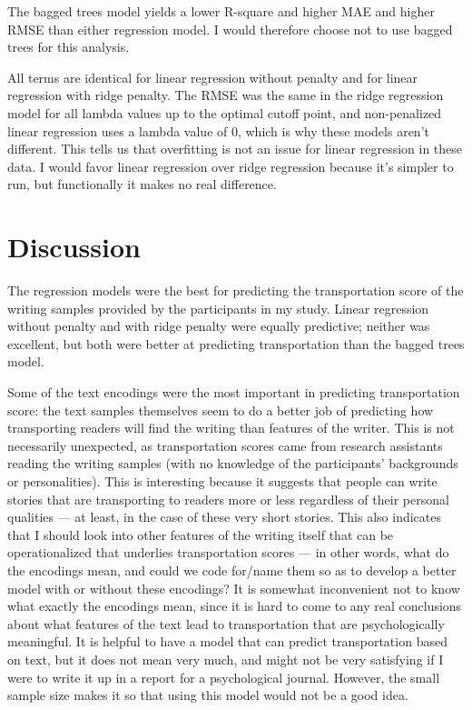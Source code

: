 \documentclass[
  man,floatsintext]{apa6}
\begin{document}
The bagged trees model yields a lower R-square and higher MAE and higher RMSE than either regression model. I would therefore choose not to use bagged trees for this analysis.

All terms are identical for linear regression without penalty and for linear regression with ridge penalty. The RMSE was the same in the ridge regression model for all lambda values up to the optimal cutoff point, and non-penalized linear regression uses a lambda value of 0, which is why these models aren't different. This tells us that overfitting is not an issue for linear regression in these data. I would favor linear regression over ridge regression because it's simpler to run, but functionally it makes no real difference.

\hypertarget{discussion}{%
\section{Discussion}\label{discussion}}

The regression models were the best for predicting the transportation score of the writing samples provided by the participants in my study. Linear regression without penalty and with ridge penalty were equally predictive; neither was excellent, but both were better at predicting transportation than the bagged trees model.

Some of the text encodings were the most important in predicting transportation score: the text samples themselves seem to do a better job of predicting how transporting readers will find the writing than features of the writer. This is not necessarily unexpected, as transportation scores came from research assistants reading the writing samples (with no knowledge of the participants' backgrounds or personalities). This is interesting because it suggests that people can write stories that are transporting to readers more or less regardless of their personal qualities --- at least, in the case of these very short stories. This also indicates that I should look into other features of the writing itself that can be operationalized that underlies transportation scores --- in other words, what do the encodings mean, and could we code for/name them so as to develop a better model with or without these encodings? It is somewhat inconvenient not to know what exactly the encodings mean, since it is hard to come to any real conclusions about what features of the text lead to transportation that are psychologically meaningful. It is helpful to have a model that can predict transportation based on text, but it does not mean very much, and might not be very satisfying if I were to write it up in a report for a psychological journal. However, the small sample size makes it so that using this model would not be a good idea.
\end{document}
